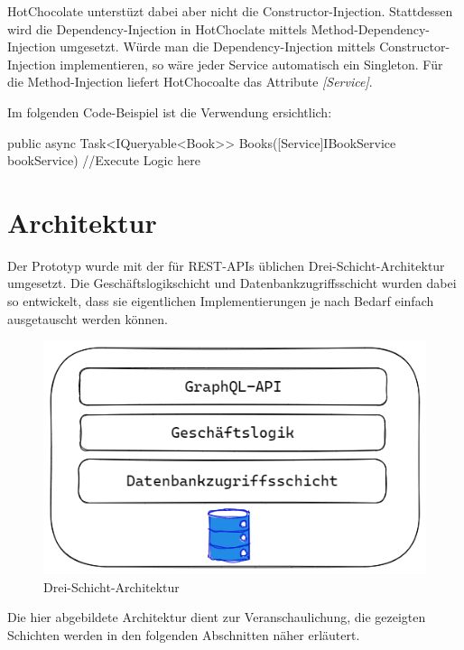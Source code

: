 HotChocolate unterstüzt dabei aber nicht die Constructor-Injection.
Stattdessen wird die Dependency-Injection in HotChoclate mittels Method-Dependency-Injection umgesetzt.
Würde man die Dependency-Injection mittels Constructor-Injection implementieren, so wäre jeder Service automatisch ein Singleton.
Für die Method-Injection liefert HotChocoalte das Attribute \textit{[Service]}.

Im folgenden Code-Beispiel ist die Verwendung ersichtlich:
\begin{JsCode}
public async Task<IQueryable<Book>> Books([Service]IBookService bookService) {
    //Execute Logic here
}
\end{JsCode}

\section{Architektur}
Der Prototyp wurde mit der für REST-APIs üblichen Drei-Schicht-Architektur umgesetzt.
Die Geschäftslogikschicht und Datenbankzugriffsschicht wurden dabei so entwickelt, dass sie eigentlichen Implementierungen je nach Bedarf einfach ausgetauscht werden können.
\newline

\begin{figure}[H]
    \includegraphics[width=\textwidth]{pics/architecture.png}
    \caption{Drei-Schicht-Architektur}
\end{figure}

Die hier abgebildete Architektur dient zur Veranschaulichung, die gezeigten Schichten werden in den folgenden Abschnitten näher erläutert.

